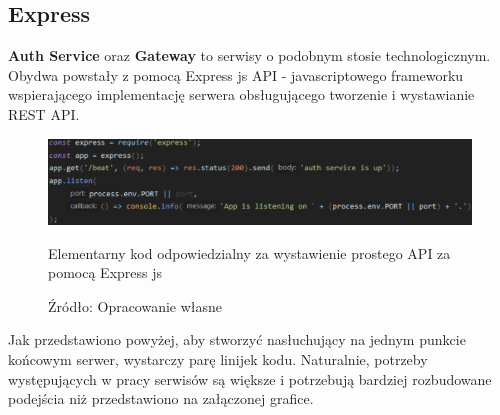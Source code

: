 \subsection{Express}
\textbf{Auth Service} oraz \textbf{Gateway} to serwisy o podobnym stosie technologicznym. Obydwa powstały z pomocą Express js API - javascriptowego frameworku wspierającego implementację serwera obsługującego tworzenie i wystawianie REST API.
\begin{figure}[H]
	\centering
	\includegraphics[width=\linewidth]{express_simple.pdf}
	\caption{Elementarny kod odpowiedzialny za wystawienie prostego API za pomocą Express js}
	\caption*{Źródło: {Opracowanie własne}}
\end{figure}
Jak przedstawiono powyżej, aby stworzyć nasłuchujący na jednym punkcie końcowym serwer, wystarczy parę linijek kodu. Naturalnie, potrzeby występujących w pracy serwisów są większe i potrzebują bardziej rozbudowane podejścia niż przedstawiono na załączonej grafice.

